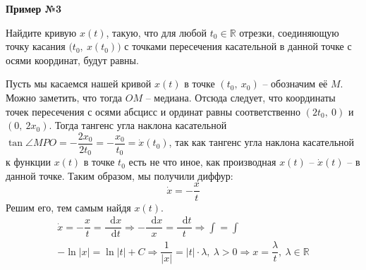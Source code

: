\documentclass[a4paper,12pt]{article}
\newcommand{\R}{\mathbb{R}}
\renewcommand*\d{\mathop{}\!\mathrm{d}}
\newcommand{\dx}{\dot{x}}
\newcommand{\ds}{\displaystyle}
\begin{document}
\textbf{Пример №3}

Найдите кривую $x(t)$, такую, что для любой $t_0 \in \R$ отрезки, соединяющую точку касания $\big(t_0,\ x(t_0)\big)$ с точками пересечения касательной в данной точке с осями координат, будут равны.

\begin{center}
\end{center}

Пусть мы касаемся нашей кривой $x(t)$ в точке $(t_0,\ x_0)$ -- обозначим её $M$. Можно заметить, что тогда $OM$ -- медиана. Отсюда следует, что координаты точек пересечения с осями абсцисс и ординат равны соответственно $(2t_0,\ 0)$ и $(0,\ 2x_0)$. Тогда тангенс угла наклона касательной $\tan \angle MPO = -\dfrac{2x_0}{2t_0} = -\dfrac{x_0}{t_0} = \dx(t_0)$, так как тангенс угла наклона касательной к функции $x(t)$ в точке $t_0$ есть не что иное, как производная $x(t)$ -- $\dx(t)$ -- в данной точке. Таким образом, мы получили диффур:
\[\dx = -\dfrac{x}{t}\] Решим его, тем самым найдя $x(t)$.
\begin{gather*}
	\dx = -\dfrac{x}{t} = \dfrac{\d x}{\d t} \Longrightarrow -\dfrac{\d x}{x} = \dfrac{\d t}{t} \Longrightarrow \ds\int = \ds\int \\
	 -\ln |x| = \ln |t| + C \Longrightarrow \dfrac{1}{|x|} = |t| \cdot \lambda,\ \lambda > 0 \Longrightarrow x = \dfrac{\lambda}{t},\ \lambda \in \R
\end{gather*}
\end{document}

